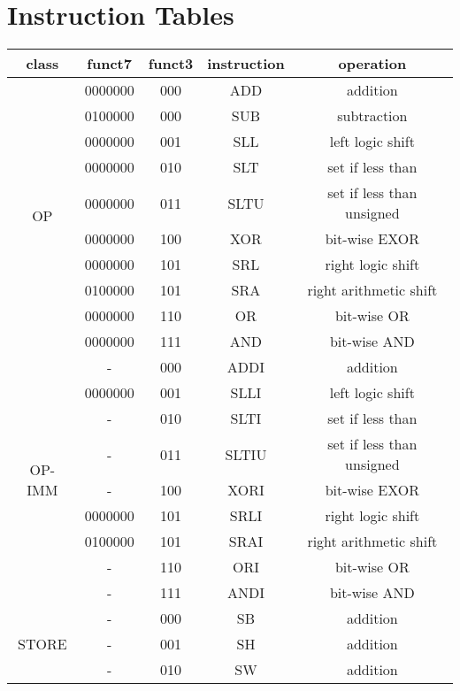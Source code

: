 \section{Instruction Tables}

\begin{table}[ht]
    \begin{center}
        \begin{tabular}{|c|c|c|c|c|}
            \hline
            class & funct7 & funct3 & instruction & operation \\
            \hline
            \multirow{10}{*}{OP} & 0000000 & 000 & ADD & addition\\
            & 0100000 & 000 & SUB & subtraction\\
            & 0000000 & 001 & SLL & left logic shift\\
            & 0000000 & 010 & SLT & set if less than\\
            & 0000000 & 011 & SLTU & set if less than unsigned\\
            & 0000000 & 100 & XOR & bit-wise EXOR\\
            & 0000000 & 101 & SRL & right logic shift\\
            & 0100000 & 101 & SRA & right arithmetic shift\\
            & 0000000 & 110 & OR & bit-wise OR\\
            & 0000000 & 111 & AND & bit-wise AND\\
            \hline
            \multirow{9}{*}{OP-IMM} & - & 000 & ADDI & addition\\
            & 0000000 & 001 & SLLI & left logic shift\\
            & - & 010 & SLTI & set if less than\\
            & - & 011 & SLTIU & set if less than unsigned\\
            & - & 100 & XORI & bit-wise EXOR\\
            & 0000000 & 101 & SRLI & right logic shift\\
            & 0100000 & 101 & SRAI & right arithmetic shift\\
            & - & 110 & ORI & bit-wise OR\\
            & - & 111 & ANDI & bit-wise AND\\
            \hline
            \multirow{3}{*}{STORE} & - & 000 & SB & addition\\
            & - & 001 & SH & addition\\
            & - & 010 & SW & addition\\

\end{tabular}
\end{center}
\end{table}
